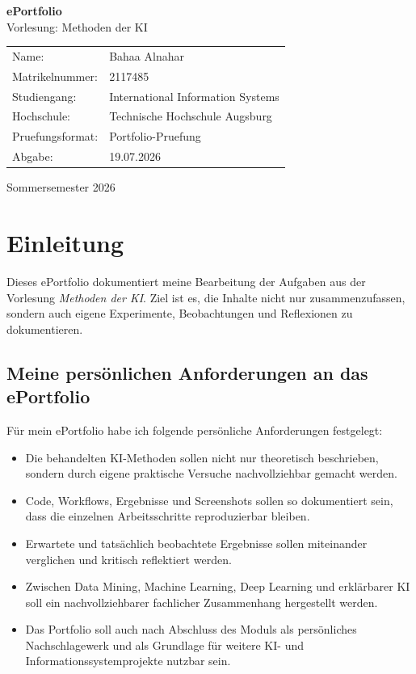 \documentclass[12pt,a4paper]{article}
\begin{document}
\begin{titlepage}
\centering
\vspace*{2cm}

{\Huge \textbf{ePortfolio}}\\[0.5cm]
{\Large Vorlesung: Methoden der KI}\\[1.5cm]

\begin{tabular}{ll}
Name: & Bahaa Alnahar \\
Matrikelnummer: & 2117485 \\
Studiengang: & International Information Systems \\
Hochschule: & Technische Hochschule Augsburg \\
Pruefungsformat: & Portfolio-Pruefung \\
Abgabe: & 19.07.2026 \\
\end{tabular}

\vfill
{\large Sommersemester 2026}

\end{titlepage}

\tableofcontents
\newpage

\section{Einleitung}

Dieses ePortfolio dokumentiert meine Bearbeitung der Aufgaben aus der Vorlesung
\textit{Methoden der KI}. Ziel ist es, die Inhalte nicht nur zusammenzufassen,
sondern auch eigene Experimente, Beobachtungen und Reflexionen zu dokumentieren.
\subsection*{Meine persönlichen Anforderungen an das ePortfolio}

Für mein ePortfolio habe ich folgende persönliche Anforderungen
festgelegt:

\begin{itemize}
    \item Die behandelten KI-Methoden sollen nicht nur theoretisch
    beschrieben, sondern durch eigene praktische Versuche
    nachvollziehbar gemacht werden.

    \item Code, Workflows, Ergebnisse und Screenshots sollen so
    dokumentiert sein, dass die einzelnen Arbeitsschritte
    reproduzierbar bleiben.

    \item Erwartete und tatsächlich beobachtete Ergebnisse sollen
    miteinander verglichen und kritisch reflektiert werden.

    \item Zwischen Data Mining, Machine Learning, Deep Learning und
    erklärbarer KI soll ein nachvollziehbarer fachlicher
    Zusammenhang hergestellt werden.

    \item Das Portfolio soll auch nach Abschluss des Moduls als
    persönliches Nachschlagewerk und als Grundlage für weitere
    KI- und Informationssystemprojekte nutzbar sein.
\end{itemize}
\newpage
\end{document}
